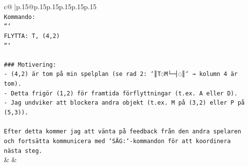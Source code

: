 \documentclass{article}
\begin{document}
{\begin{supertabular}{c@{$\;$}|p{.15\linewidth}@{}p{.15\linewidth}p{.15\linewidth}p{.15\linewidth}p{.15\linewidth}p{.15\linewidth}}
{{{\\ 
\texttt{Kommando:} \\
\texttt{```} \\
\texttt{FLYTTA: T, (4,2)} \\
\texttt{```} \\
\\ 
\texttt{\#\#\# Motivering:} \\
\texttt{{-} (4,2) är tom på min spelplan (se rad 2: `║T◌M└─┤◌║` → kolumn 4 är tom).} \\
\texttt{{-} Detta frigör (1,2) för framtida förflyttningar (t.ex. A eller D).} \\
\texttt{{-} Jag undviker att blockera andra objekt (t.ex. M på (3,2) eller P på (5,3)).} \\
\\ 
\texttt{Efter detta kommer jag att vänta på feedback från den andra spelaren och fortsätta kommunicera med `SÄG:`{-}kommandon för att koordinera nästa steg.} \\
            }
        }
    }
    & & \\ \\


\end{supertabular}}
\end{document}
